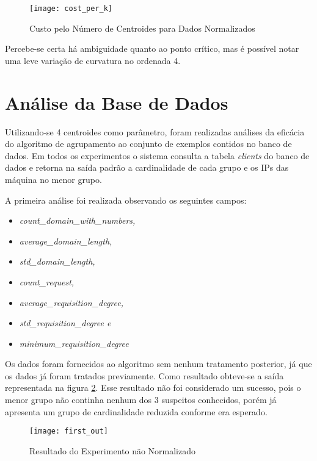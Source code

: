 \begin{figure}[htbp]
\centering
\texttt{[image: cost\_per\_k]}
\caption[Custo pelo Número de Centroides para Dados Normalizados]{Custo pelo Número de Centroides para Dados Normalizados} \label{fig:cost_per_k}
\end{figure}

Percebe-se certa há ambiguidade quanto ao ponto crítico, mas é possível notar uma leve variação de curvatura no ordenada 4.

\section{Análise da Base de Dados}
\label{sec:db_analysis}

Utilizando-se 4 centroides como parâmetro, foram realizadas análises da eficácia do algoritmo de agrupamento ao conjunto de exemplos contidos no banco de dados. Em todos os experimentos o sistema consulta a tabela \textit{clients} do banco de dados e retorna na saída padrão a cardinalidade de cada grupo e os IPs das máquina no menor grupo.

A primeira análise foi realizada observando os seguintes campos:

\begin{itemize}
\item \textit{count\_domain\_with\_numbers, }
\item \textit{average\_domain\_length, }
\item \textit{std\_domain\_length, }
\item \textit{count\_request, }
\item \textit{average\_requisition\_degree, }
\item \textit{std\_requisition\_degree e }
\item \textit{minimum\_requisition\_degree }
\end{itemize}

Os dados foram fornecidos ao algoritmo sem nenhum tratamento posterior, já que os dados já foram tratados previamente. Como resultado obteve-se a saída representada na figura \ref{fig:first_out}. Esse resultado não foi considerado um sucesso, pois o menor grupo não continha nenhum dos 3 suspeitos conhecidos, porém já apresenta um grupo de cardinalidade reduzida conforme era esperado.

\begin{figure}[htbp]
\centering
\texttt{[image: first\_out]}
\caption[Resultado do Experimento não Normalizado]{Resultado do Experimento não Normalizado} \label{fig:first_out}
\end{figure}

